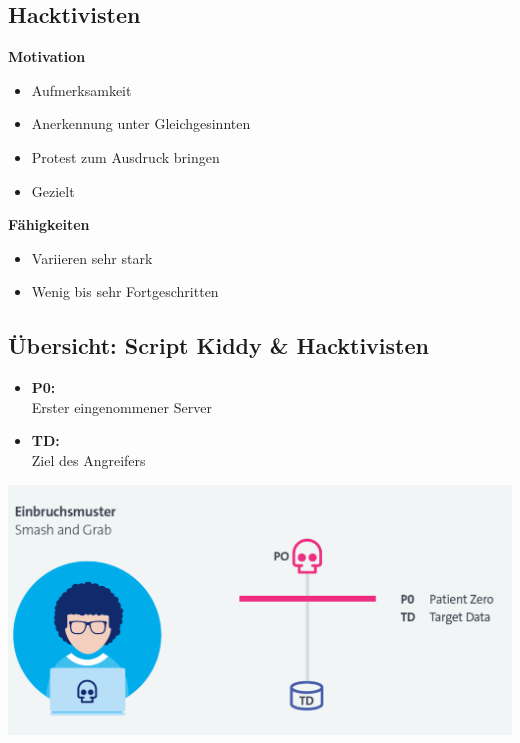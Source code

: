 \subsection{Hacktivisten}
\vspace{-8pt}
\begin{multicols*}{2}
    \textbf{Motivation}
    \begin{itemize}
        \item Aufmerksamkeit
        \item Anerkennung unter Gleichgesinnten
        \item Protest zum Ausdruck bringen
        \item Gezielt
    \end{itemize}
    \textbf{Fähigkeiten}
    \begin{itemize}
        \item Variieren sehr stark
        \item Wenig bis sehr Fortgeschritten
    \end{itemize}
\end{multicols*}
\vspace{-8pt}


\subsection{Übersicht: Script Kiddy \& Hacktivisten}
\begin{minipage}{0.3\linewidth}
    \begin{itemize}
        \item \textbf{P0:}\\ Erster eingenommener Server
        \item \textbf{TD:}\\ Ziel des Angreifers
    \end{itemize}
\end{minipage}
\begin{minipage}{0.7\linewidth}
    \begin{center}
        \includegraphics[width=\linewidth]{./img/01-cyber_defense/script_hacktivist}
    \end{center}
\end{minipage}

